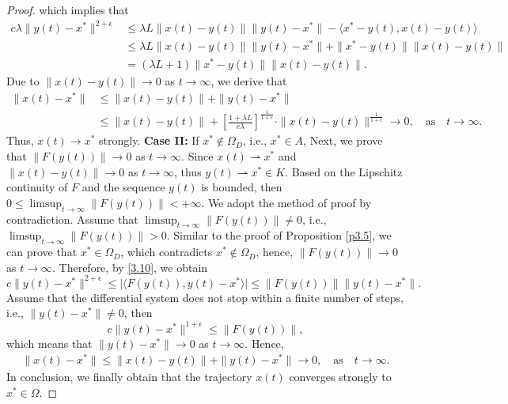 \documentclass[hidelinks,11 pt]{article}
\numberwithin{equation}{section}
\theoremstyle{definition}  %
\numberwithin{equation}{section}
\numberwithin{theorem}{section}
\begin{document}
\begin{proof}
which implies that 
\begin{align*}
    c\lambda\|y(t)-x^*\|^{2+\epsilon}&\leq \lambda L\|x(t)-y(t)\|\|y(t)-x^*\|- \langle x^*-y(t),x(t)-y(t)\rangle\\
    &\leq\lambda L\|x(t)-y(t)\|\|y(t)-x^*\|+\|x^*-y(t)\|\|x(t)-y(t)\|\\
     & = \left(\lambda L+1\right)\|x^*-y(t)\|\|x(t)-y(t)\|. 
\end{align*}
Due to $\|x(t)-y(t)\|\to 0$ as $t\to\infty$, we derive that 
\begin{align*}
    \|x(t)-x^*\|&\leq \|x(t)-y(t)\|+\|y(t)-x^*\|\\
    &\leq  \|x(t)-y(t)\|+\left[\frac{1+\lambda L}{c\lambda}\right]^{\frac{1}{1+\epsilon}}\cdot\|x(t)-y(t)\|^{\frac{1}{1+\epsilon}}\to 0, \quad \text{as} \quad t\to\infty.
\end{align*}
Thus, $x(t)\to x^*$ strongly.
\vskip 2mm 
\textbf{Case II:} If $x^*\notin\Omega_{D}$, i.e., $x^*\in A$, Next, we prove that $\|F(y(t))\|\to 0$ as $t\to\infty$. 
\vskip 2mm 
Since $x(t)\rightharpoonup x^*$ and $\|x(t)-y(t)\|\to 0$ as $t\to\infty$, thus  $y(t)\rightharpoonup x^*\in K$. Based on the Lipschitz continuity of $F$ and the sequence $y(t)$ is bounded, then $0\leq \limsup_{t\to\infty}\|F(y(t))\|<+\infty$. We adopt the method of proof by contradiction. Assume that $\limsup_{t\to\infty}\|F(y(t))\|\neq 0$, i.e., $\limsup_{t\to\infty}\|F(y(t))\|> 0$. Similar to the proof of Proposition \ref{p3.5}, we can prove that $x^*\in\Omega_{D}$, which contradicts $x^*\notin \Omega_{D}$, hence, $\|F(y(t))\|\to 0$ as $t\to\infty$. Therefore, by \eqref{3.10}, we obtain 
\begin{equation*}
    c\|y(t)-x^*\|^{2+\epsilon}\leq  \vert \langle F(y(t)),y(t)-x^*\rangle\vert\leq \|F(y(t))\|\|y(t)-x^*\|. 
\end{equation*}
Assume that the differential system does not stop within a finite number of steps, i.e., $\|y(t)-x^*\|\neq 0$, then 
\begin{equation*}
     c\|y(t)-x^*\|^{1+\epsilon}\leq \|F(y(t))\|, 
\end{equation*}
which means that $\|y(t)-x^*\|\to 0$ as $t\to\infty$. Hence, 
\begin{align*}
    \|x(t)-x^*\|\leq \|x(t)-y(t)\|+\|y(t)-x^*\|\to 0, \quad \text{as} \quad t\to\infty. 
\end{align*}
In conclusion, we finally obtain that the trajectory $x(t)$ converges strongly to $x^*\in \Omega$.     
\end{proof}
\end{document}
